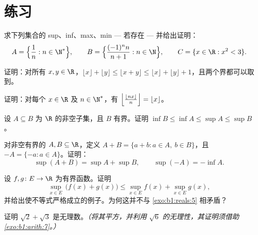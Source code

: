 \section{练习}

\begin{exercise}[$\star$]\label{exo:b1:reals:1}
求下列集合的 sup、inf、max、min --- 若存在 --- 并给出证明：
\[
A = \Bigl\{\frac{1}{n} : n \in \N^*\Bigr\},
\qquad
B = \Bigl\{\frac{(-1)^n n}{n+1} : n \in \N\Bigr\},
\qquad
C = \{x \in \R : x^2 < 3\}.
\]
\end{exercise}

\begin{exercise}[$\star$]\label{exo:b1:reals:2}
证明：对所有 $x, y \in \R$，$\lfloor x \rfloor + \lfloor y
\rfloor \leq \lfloor x + y \rfloor \leq \lfloor x \rfloor + \lfloor y
\rfloor + 1$，且两个界都可以取到。
\end{exercise}

\begin{exercise}[$\star$]\label{exo:b1:reals:3}
证明：对每个 $x \in \R$ 及 $n \in \N^*$，有
$\Bigl\lfloor \frac{\lfloor nx \rfloor}{n} \Bigr\rfloor = \lfloor x
\rfloor$。
\end{exercise}

\begin{exercise}[$\star$]\label{exo:b1:reals:4}
设 $A \subseteq B$ 为 $\R$ 的非空子集，且 $B$ 有界。证明
$\inf B \leq \inf A \leq \sup A \leq \sup B$。
\end{exercise}

\begin{exercise}[$\star\star$]\label{exo:b1:reals:5}
对非空有界的 $A, B \subseteq \R$，定义 $A + B = \{a + b : a
\in A,\ b \in B\}$，且 $-A = \{-a : a \in A\}$。证明：
\[
\sup(A + B) = \sup A + \sup B,
\qquad
\sup(-A) = -\inf A .
\]
\end{exercise}

\begin{exercise}[$\star\star$]\label{exo:b1:reals:6}
设 $f, g \colon E \to \R$ 为有界函数。证明
\[
\sup_{x \in E}\, \bigl(f(x) + g(x)\bigr) \leq \sup_{x \in E} f(x) +
\sup_{x \in E} g(x),
\]
并给出使不等式严格成立的例子。为何这并不与
\cref{exo:b1:reals:5} 相矛盾？
\end{exercise}

\begin{exercise}[$\star\star$]\label{exo:b1:reals:7}
证明 $\sqrt 2 + \sqrt 3$ 是无理数。\emph{（将其平方，并利用
$\sqrt 6$ 的无理性，其证明须借助
\cref{exo:b1:arith:7}。）}
\end{exercise}

